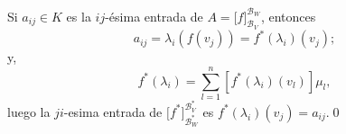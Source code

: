 \dem Si $a_{ij}\in K$ es la $ij$-\'esima entrada de $A=\Big[f\Big]^{\mathcal{B}_W}_{\mathcal{B}_V}$, entonces
\[
a_{ij}=\lambda_i\left(f(v_j)\right)=f^*(\lambda_i)(v_j);
\]
y,
\[
f^*(\lambda_i)=\sum_{l=1}^{n}\left[f^*(\lambda_i)(v_l)\right]\mu_l,
\]
luego la $ji$-esima entrada de $\Big[f^*\Big]^{\mathcal{B}_V^*}_{\mathcal{B}_W^*}$ es $f^*(\lambda_i)(v_j)=a_{ij}$.\qed